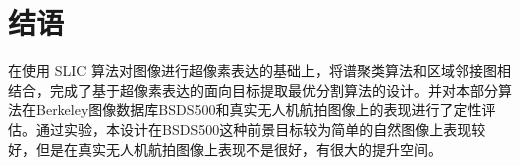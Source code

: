\section{结语}
在使用 SLIC 算法对图像进行超像素表达的基础上，将谱聚类算法和区域邻接图相结合，完成了基于超像素表达的面向目标提取最优分割算法的设计。并对本部分算法在Berkeley图像数据库BSDS500和真实无人机航拍图像上的表现进行了定性评估。通过实验，本设计在BSDS500这种前景目标较为简单的自然图像上表现较好，但是在真实无人机航拍图像上表现不是很好，有很大的提升空间。